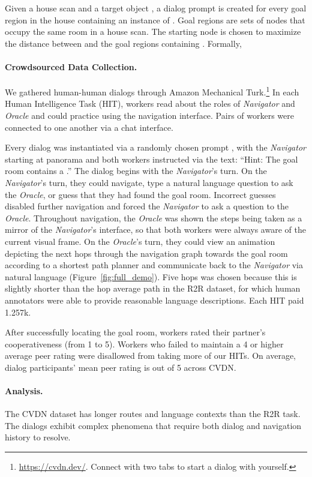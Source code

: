 \documentclass{article}
\newcommand{\dataset}{CVDN}
\newcommand{\nav}{\textit{Navigator}}
\newcommand{\ora}{\textit{Oracle}}
\begin{document}
Given a house scan  and a target object , a dialog prompt is created for every goal region  in the house containing an instance of .
Goal regions are sets of nodes that occupy the same room in a house scan.
The starting node  is chosen to maximize the distance between  and the goal regions  containing .
Formally,


\paragraph{Crowdsourced Data Collection.}
We gathered human-human dialogs through Amazon Mechanical Turk.\footnote{\url{https://cvdn.dev/}. Connect with two tabs to start a dialog with yourself.}
In each Human Intelligence Task (HIT), workers read about the roles of \nav{} and \ora{} and could practice using the navigation interface.
Pairs of workers were connected to one another via a chat interface.

Every dialog was instantiated via a randomly chosen prompt , with the \nav{} starting at panorama  and both workers instructed via the text: ``Hint: The goal room contains a .''
The dialog begins with the \nav{}'s turn.
On the \nav{}'s turn, they could navigate, type a natural language question to ask the \ora{}, or guess that they had found the goal room.
Incorrect guesses disabled further navigation and forced the \nav{} to ask a question to the \ora{}.
Throughout navigation, the \ora{} was shown the steps being taken as a mirror of the \nav{}'s interface, so that both workers were always aware of the current visual frame.
On the \ora{}'s turn, they could view an animation depicting the next  hops through the navigation graph towards the goal room according to a shortest path planner and communicate back to the \nav{} via natural language (Figure~\ref{fig:full_demo}).
Five hops was chosen because this is slightly shorter than the  hop average path in the R2R dataset, for which human annotators were able to provide reasonable language descriptions.
Each HIT paid 1.257k.

After successfully locating the goal room, workers rated their partner's cooperativeness (from 1 to 5).
Workers who failed to maintain a 4 or higher average peer rating were disallowed from taking more of our HITs.
On average, dialog participants' mean peer rating is  out of 5 across \dataset{}.

\paragraph{Analysis.}
The \dataset{} dataset has longer routes and language contexts than the R2R task.
The dialogs exhibit complex phenomena that require both dialog and navigation history to resolve.
\end{document}
